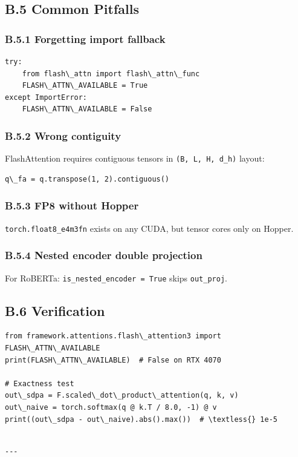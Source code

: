 \subsection{B.5 Common Pitfalls}

\subsubsection{B.5.1 Forgetting import fallback}
\begin{lstlisting}
try:
    from flash\_attn import flash\_attn\_func
    FLASH\_ATTN\_AVAILABLE = True
except ImportError:
    FLASH\_ATTN\_AVAILABLE = False
\end{lstlisting}

\subsubsection{B.5.2 Wrong contiguity}
FlashAttention requires contiguous tensors in \texttt{(B, L, H, d\_h)} layout:
\begin{lstlisting}
q\_fa = q.transpose(1, 2).contiguous()
\end{lstlisting}

\subsubsection{B.5.3 FP8 without Hopper}
\texttt{torch.float8\_e4m3fn} exists on any CUDA, but tensor cores only on Hopper.

\subsubsection{B.5.4 Nested encoder double projection}
For RoBERTa: \texttt{is\_nested\_encoder = True} skips \texttt{out\_proj}.

\subsection{B.6 Verification}

\begin{lstlisting}
from framework.attentions.flash\_attention3 import FLASH\_ATTN\_AVAILABLE
print(FLASH\_ATTN\_AVAILABLE)  # False on RTX 4070

# Exactness test
out\_sdpa = F.scaled\_dot\_product\_attention(q, k, v)
out\_naive = torch.softmax(q @ k.T / 8.0, -1) @ v
print((out\_sdpa - out\_naive).abs().max())  # \textless{} 1e-5
\end{lstlisting}
\begin{lstlisting}

---
\end{lstlisting}